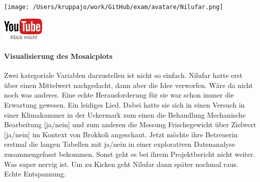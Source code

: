 \documentclass[a4paper, 9pt]{scrartcl}\usepackage[]{graphicx}\usepackage[]{xcolor}
\begin{document}
 
\begin{minipage}[t]{0.5\textwidth}
\texttt{[image: /Users/kruppajo/work/GitHub/exam/avatare/Nilufar.png]}
\end{minipage}
\begin{minipage}[t]{0.5\textwidth}
\hfill
\href{https://youtu.be/t_1KL77mfmg}{\includegraphics[width = 2cm]{img/youtube}}
\end{minipage}
\vspace{-3ex}



\paragraph{Visualisierung des Mosaicplots}

Zwei kategoriale Variablen darzustellen ist nicht so einfach. Nilufar hatte erst über einen Mittelwert nachgedacht, dann aber die Idee verworfen. Wäre da nicht noch was anderes. Eine echte Herausforderung für sie war schon immer die Erwartung gewesen. Ein leidiges Lied. Dabei hatte sie sich in einen Versuch in einer Klimakammer in der Uckermark zum einen die Behandlung Mechanische Bearbeitung [ja/nein] und zum anderen die Messung Frischegewicht über Zielwert [ja/nein] im Kontext von Brokkoli angeschaut. Jetzt möchte ihre Betreuerin erstmal die langen Tabellen mit ja/nein in einer explorativen Datenanalyse zusammengefasst bekommen. Sonst geht es bei ihrem Projektbericht nicht weiter. Was super nervig ist. Um zu Kicken geht Nilufar dann später nochmal raus. Echte Entspannung.



\vspace{1Ex}
\end{document}
